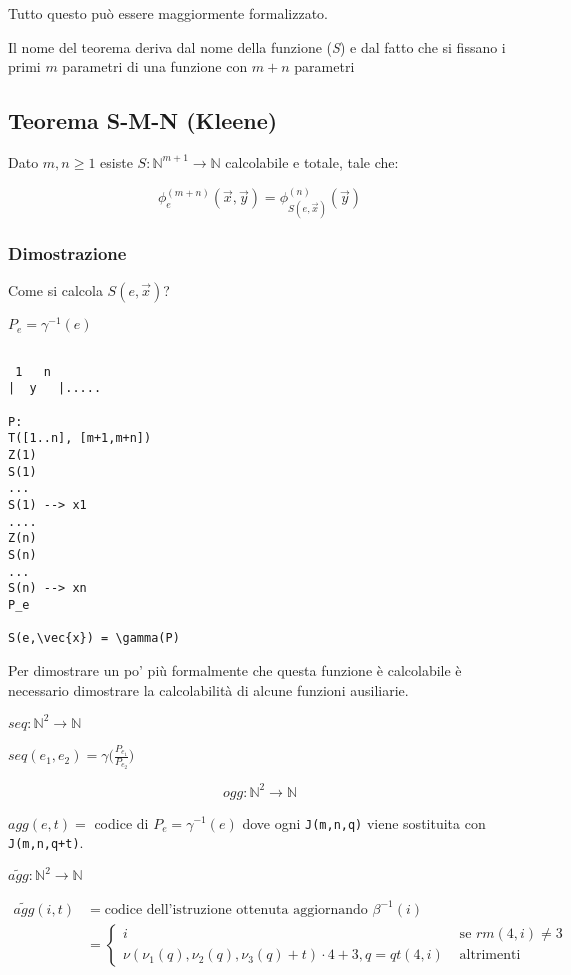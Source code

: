 Tutto questo può essere maggiormente formalizzato.

Il nome del teorema deriva dal nome della funzione (\textit{S}) e dal fatto che si fissano i primi $ m $ parametri di una funzione con $ m+n $ parametri

\subsection{Teorema S-M-N (Kleene)}

Dato $ m,n \geq 1 $ esiste $ S : \mathbb{N}^{m+1} \rightarrow  \mathbb{N}$ calcolabile e totale, tale che:

$$
\phi_{e}^{(m+n)}(\vec{x},\vec{y}) = \phi_{S(e,\vec{x})}^{(n)}(\vec{y})
$$

\subsubsection{Dimostrazione}

Come si calcola $ S(e,\vec{x}) $?

$ P_e = \gamma^{-1}(e) $ 

\begin{verbatim}
 
 1   n
|  y   |..... 

P:
T([1..n], [m+1,m+n])
Z(1)
S(1)
...
S(1) --> x1
....
Z(n)
S(n)
...
S(n) --> xn
P_e

S(e,\vec{x}) = \gamma(P)

\end{verbatim}

Per dimostrare un po' più formalmente che questa funzione è calcolabile è necessario dimostrare la calcolabilità di alcune funzioni ausiliarie.

$ seq : \mathbb{N}^2 \rightarrow  \mathbb{N}$

$ seq(e_1,e_2) = \gamma\Big(\frac{P_{e_1}}{P_e_2} \Big)$

$$
ogg:  \mathbb{N}^2 \rightarrow  \mathbb{N}
$$

$agg(e,t) = $ codice di $ P_e = \gamma^{-1}(e)$ dove ogni \texttt{J(m,n,q)} viene sostituita con \texttt{J(m,n,q+t)}.

$\widetilde{agg}:  \mathbb{N}^2 \rightarrow  \mathbb{N}$

\begin{align*}
\widetilde{agg}(i,t) &= \text{codice dell'istruzione ottenuta aggiornando } \beta^{-1}(i) \\
								 &= \begin{cases}
								 i &\text{ se } rm(4,i) \neq 3 \\
								 \nu(\nu_1(q), \nu_2(q), \nu_3(q)+t)\cdot 4 +3, q = qt(4,i) &\text{ altrimenti}
								 \end{cases}
\end{align*}

